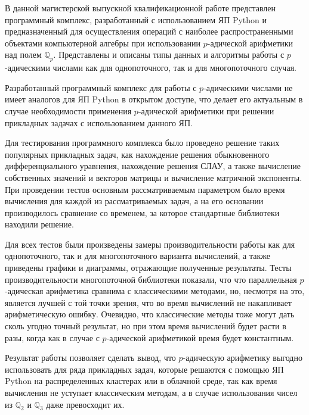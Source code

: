 \documentclass[master, och, diploma, times]{sty/SCWorks}
\theoremstyle{plain}
\theoremstyle{definition}
\numberwithin{equation}{section}
\begin{document}
\conclusion

В данной магистерской выпускной квалификационной работе представлен программный комплекс, разработанный с использованием ЯП Python и предназначенный для осуществления операций с наиболее распространенными объектами компьютерной алгебры при использовании $p$-адической арифметики над полем $\mathbb{Q}_p$. Представлены и описаны типы данных и алгоритмы работы с $p$-адическими числами как для однопоточного, так и для многопоточного случая.

Разработанный программный комплекс для работы с $p$-адическими числами не имеет аналогов для ЯП Python в открытом доступе, что делает его актуальным в случае необходимости применения $p$-адической арифметики при решении прикладных задачах с использованием данного ЯП.

Для тестирования программного комплекса было проведено решение таких популярных прикладных задач, как нахождение решения обыкновенного дифференциального уравнения, нахождение решения СЛАУ, а также вычисление собственных значений и векторов матрицы и вычисление матричной экспоненты. При проведении тестов  основным рассматриваемым параметром было время вычисления для каждой из рассматриваемых задач, а на его основании производилось сравнение со временем, за которое стандартные библиотеки находили решение.

Для всех тестов были произведены замеры производительности работы как для однопоточного, так и для многопоточного варианта вычислений, а также приведены графики и диаграммы, отражающие полученные результаты. Тесты производительности многопоточной библиотеки показали, что что параллельная $p$-адическая арифметика сравнима с классическими методами, но, несмотря на это, является лучшей с той точки зрения, что во время вычислений не накапливает арифметическую ошибку. Очевидно, что классические методы тоже могут дать сколь угодно точный результат, но при этом время вычислений будет расти в разы, когда как в случае с $p$-адической арифметикой время будет константным.

Результат работы позволяет сделать вывод, что $p$-адическую арифметику выгодно использовать для ряда прикладных задач, которые решаются с помощью ЯП Python на распределенных кластерах или в облачной среде, так как время вычисления не уступает классическим методам, а в случае использования чисел из $\mathbb{Q}_2$ и $\mathbb{Q}_3$ даже превосходит их.




\end{document}
